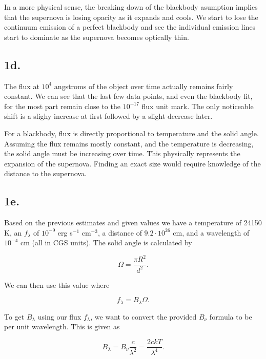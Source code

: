 \documentclass{article}
\begin{document}
In a more physical sense, the breaking down of the blackbody asumption implies that the supernova is losing opacity as it expands and cools. We start to lose the continuum emission of a perfect blackbody and see the individual emission lines start to dominate as the supernova becomes optically thin.

\subsection*{1d.}
The flux at $10^4$ angstroms of the object over time actually remains fairly constant. We can see that the last few data points, and even the blackbody fit, for the most part remain close to the $10^{-17}$ flux unit mark. The only noticeable shift is a slighy increase at first followed by a slight decrease later.

For a blackbody, flux is directly proportional to temperature and the solid angle. Assuming the flux remains mostly constant, and the temperature is decreasing, the solid angle must be increasing over time. This physically represents the expansion of the supernova. Finding an exact size would require knowledge of the distance to the supernova.

\subsection*{1e.}
Based on the previous estimates and given values we have a temperature of 24150 K, an $f_\lambda$ of $10^{-9}$ erg s$^{-1}$ cm$^{-3}$, a distance of $9.2\cdot10^{26}$ cm, and a wavelength of $10^{-4}$ cm (all in CGS units). The solid angle is calculated by

\begin{equation}
    \Omega=\frac{\pi R^2}{d^2}.
    \label{eqn:omega}
\end{equation}

We can then use this value where

\begin{equation}
    f_\lambda=B_\lambda \Omega.
    \label{eqn:flam}
\end{equation}

To get $B_\lambda$ using our flux $f_\lambda$, we want to convert the provided $B_\nu$ formula to be per unit wavelength. This is given as

\begin{equation}
    B_\lambda=B_\nu\frac{c}{\lambda^2}=\frac{2ckT}{\lambda^4}.
    \label{eqn:blam}
\end{equation}
\end{document}
